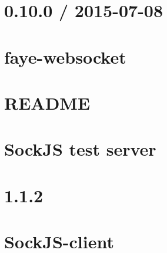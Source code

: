 \documentclass[twoside]{book}
\newcommand{\+}{\discretionary{\mbox{\scriptsize$\hookleftarrow$}}{}{}}
\begin{document}
\chapter{0.10.0 / 2015-\/07-\/08}
\label{md__c_1_workspace_demo_src_main_script_node_modules_sockjs_node_modules_faye-websocket__c_h_a_n_g_e_l_o_g}

\chapter{faye-\/websocket}
\label{md__c_1_workspace_demo_src_main_script_node_modules_sockjs_node_modules_faye-websocket__r_e_a_d_m_e}

\chapter{R\+E\+A\+D\+ME}
\label{md__c_1_workspace_demo_src_main_script_node_modules_sockjs__r_e_a_d_m_e}

\chapter{Sock\+JS test server}
\label{md__c_1_workspace_demo_src_main_script_node_modules_sockjs_tests_test_server__r_e_a_d_m_e}

\chapter{1.1.2}
\label{md__c_1_workspace_demo_src_main_script_node_modules_sockjs-client__changelog}

\chapter{Sock\+J\+S-\/client}
\label{md__c_1_workspace_demo_src_main_script_node_modules_sockjs-client__r_e_a_d_m_e}

\end{document}
